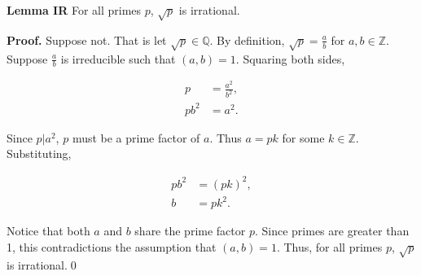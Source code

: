 \documentclass[12pt]{article}
\begin{document}
\noindent\textbf{Lemma IR} For all primes $p$, $\sqrt{p}$ is irrational.

\bigskip

\noindent\textbf{Proof.} Suppose not. That is let $\sqrt{p}\in\mathbb{Q}$. By definition, $\sqrt{p}=\frac{a}{b}$ for $a,b\in\mathbb{Z}$. Suppose $\frac{a}{b}$ is irreducible such that $(a,b)=1$. Squaring both sides, 

\begin{align*}
p &= \frac{a^2}{b^2}, \\
pb^2 &= a^2.
\end{align*}

\noindent Since $p|a^2$, $p$ must be a prime factor of $a$. Thus $a=pk$ for some $k\in\mathbb{Z}$. Substituting,

\begin{align*}
pb^2 &= (pk)^2, \\
b &= pk^2.
\end{align*}

\noindent Notice that both $a$ and $b$ share the prime factor $p$. Since primes are greater than 1, this contradictions the assumption that $(a,b)=1$. Thus, for all primes $p$, $\sqrt{p}$ is irrational.\qed
\end{document}
